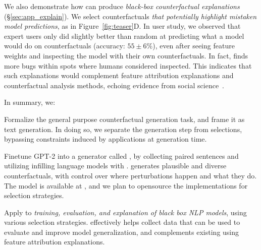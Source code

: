 We also demonstrate how \sysname can produce \emph{black-box counterfactual explanations} (\S\ref{sec:app_explain}).
We select \sysname counterfactuals \emph{that potentially highlight mistaken model predictions}, as in Figure~\ref{fig:teaser}D.
In user study, we observed that expert users only did slightly better than random at predicting what a model would do on \sysname counterfactuals (accuracy: $55 \pm 6\%$), even after seeing feature weights and inspecting the model with their own counterfactuals.
In fact, \sysname finds more bugs within spots where humans considered inspected.
This indicates that such explanations would complement feature attribution explanations and counterfactual analysis methods, echoing evidence from social science~\cite{miller}.


In summary, we:
\begin{compactenum}
\item  Formalize the general purpose counterfactual generation task, and frame it as text generation. In doing so, we separate the generation step from selections, bypassing constraints induced by applications at generation time.
\item Finetune GPT-2 into a generator called \sysname, by collecting paired sentences and utilizing infilling language models with \tagstrs. 
\sysname generates plausible and diverse counterfactuals, with control over where perturbations happen and what they do.
The model is available at \modelurl, and we plan to opensource the implementations for selection strategies.
\item Apply \sysname to \emph{training, evaluation, and explanation of black box NLP models}, using various selection strategies.
\sysname effectively helps collect data that can be used to evaluate and improve model generalization, and complements existing using feature attribution explanations.
\end{compactenum}


